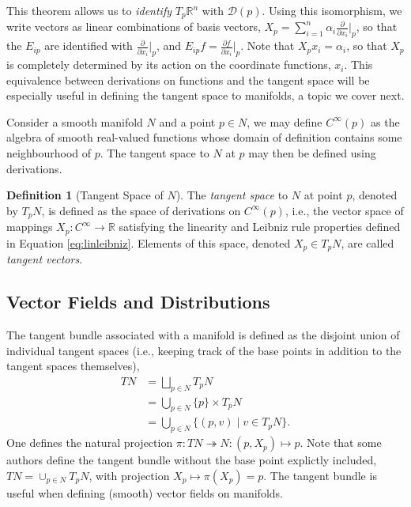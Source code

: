 \documentclass[psamsfonts]{amsart}
\theoremstyle{definition}
\newtheorem{defn}[thm]{Definition}
\theoremstyle{remark}
\newcommand*\R{\mathds{R}}
\numberwithin{equation}{section}
\begin{document}
This theorem allows us to \textit{identify} $T_p\R^n$ with $\mathscr{D}(p)$. Using this isomorphism, we write vectors as linear combinations of basis vectors, $X_p = \sum_{i = 1}^n \alpha_i \frac{\partial}{\partial x_i}\bigr|_p$, so that the $E_{ip}$ are identified with $\frac{\partial}{\partial x_i}\bigr|_p$, and $E_{ip}f = \frac{\partial f }{ \partial x_i}\bigr|_p$. Note that $X_p x_i = \alpha_i$, so that $X_p$ is completely determined by its action on the coordinate functions, $x_i$. This equivalence between derivations on functions and the tangent space will be especially useful in defining the tangent space to manifolds, a topic we cover next. 

Consider a smooth manifold $N$ and a point $p \in N$, we may define $C^{\infty}(p)$ as the algebra of smooth real-valued functions whose domain of definition contains some neighbourhood of $p$. The tangent space to $N$ at $p$ may then be defined using derivations. 
\begin{defn}[Tangent Space of $N$]\label{def:tangentspace}
The \textit{tangent space} to $N$ at point $p$, denoted by $T_pN$, is defined as the space of derivations on $C^{\infty}(p)$, i.e., the vector space of mappings $X_p: C^{\infty}\rightarrow \R$ satisfying the linearity and Leibniz rule properties defined in Equation \ref{eq:linleibniz}. Elements of this space, denoted $X_p\in T_pN$, are called \textit{tangent vectors}. 
\end{defn} 





\subsection{Vector Fields and Distributions}
The tangent bundle associated with a manifold is defined as the disjoint union of individual tangent spaces (i.e., keeping track of the base points in addition to the tangent spaces themselves), 
\begin{equation}
\begin{aligned}
TN & = {} \bigsqcup_{p \in N} T_pN\\
 & = {} \bigcup_{p \in N} \{p\} \times T_pN\\
 & = {} \bigcup_{p \in N} \{(p, v) \mid v \in T_pN\}.
\end{aligned}
\end{equation}
One defines the natural projection $\pi : TN \twoheadrightarrow N : (p, X_p) \mapsto p$. %
Note that some authors define the tangent bundle without the base point explictly included, $TN = \cup_{p\in N}T_pN$, with projection $X_p \mapsto \pi(X_p) = p$. The tangent bundle is useful when defining (smooth) vector fields on manifolds. 
\end{document}
